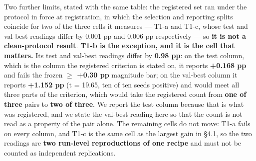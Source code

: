 \documentclass[pdflatex,sn-mathphys-ay]{sn-jnl}
\begin{document}
Two further limits, stated with the same table: the registered set ran under the protocol in force at registration, in which the selection and reporting splits coincide for two of the three cells it measures --- T1-a and T1-c, whose test and val-best readings differ by 0.001 pp and 0.006 pp respectively --- so \textbf{it is not a clean-protocol result}. \textbf{T1-b is the exception, and it is the cell that matters.} Its test and val-best readings differ by \textbf{0.98 pp}: on the test column, which is the column the registered criterion is stated on, it reports \textbf{+0.168 pp} and fails the frozen \textbf{\ensuremath{\geq} +0.30 pp} magnitude bar; on the val-best column it reports \textbf{+1.152 pp} (t = 19.65, ten of ten seeds positive) and would meet all three parts of the criterion, which would take the registered count from \textbf{one of three} pairs to \textbf{two of three}. We report the test column because that is what was registered, and we state the val-best reading here so that the count is not read as a property of the pair alone. The remaining cells do not move: T1-a fails on every column, and T1-c is the same cell as the largest gain in \S{}4.1, so the two readings are \textbf{two run-level reproductions of one recipe} and must not be counted as independent replications.
\end{document}
